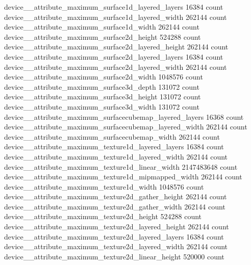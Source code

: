 device__attribute_maximum_surface1d_layered_layers                                         16384 count
device__attribute_maximum_surface1d_layered_width                                         262144 count
device__attribute_maximum_surface1d_width                                                 262144 count
device__attribute_maximum_surface2d_height                                                524288 count
device__attribute_maximum_surface2d_layered_height                                        262144 count
device__attribute_maximum_surface2d_layered_layers                                         16384 count
device__attribute_maximum_surface2d_layered_width                                         262144 count
device__attribute_maximum_surface2d_width                                                1048576 count
device__attribute_maximum_surface3d_depth                                                 131072 count
device__attribute_maximum_surface3d_height                                                131072 count
device__attribute_maximum_surface3d_width                                                 131072 count
device__attribute_maximum_surfacecubemap_layered_layers                                    16368 count
device__attribute_maximum_surfacecubemap_layered_width                                    262144 count
device__attribute_maximum_surfacecubemap_width                                            262144 count
device__attribute_maximum_texture1d_layered_layers                                         16384 count
device__attribute_maximum_texture1d_layered_width                                         262144 count
device__attribute_maximum_texture1d_linear_width                                      2147483648 count
device__attribute_maximum_texture1d_mipmapped_width                                       262144 count
device__attribute_maximum_texture1d_width                                                1048576 count
device__attribute_maximum_texture2d_gather_height                                         262144 count
device__attribute_maximum_texture2d_gather_width                                          262144 count
device__attribute_maximum_texture2d_height                                                524288 count
device__attribute_maximum_texture2d_layered_height                                        262144 count
device__attribute_maximum_texture2d_layered_layers                                         16384 count
device__attribute_maximum_texture2d_layered_width                                         262144 count
device__attribute_maximum_texture2d_linear_height                                         520000 count
